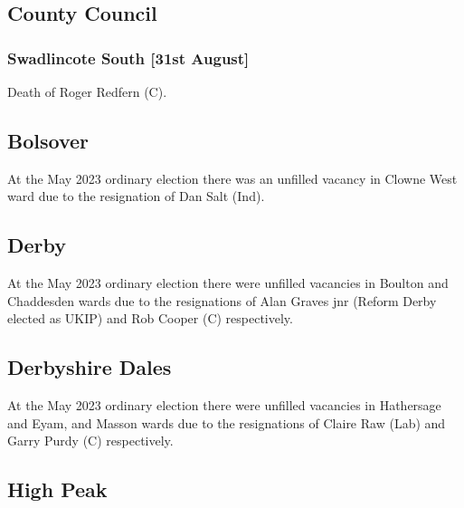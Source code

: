 \documentclass[a4paper,openany]{book}
\begin{document}
\begin{resultsiii}
\subsection*{County Council}

\subsubsection*{Swadlincote South \hspace*{\fill}\nolinebreak[1]%
	\enspace\hspace*{\fill}
	[31st August]}


Death of Roger Redfern (C).

\subsection*{Bolsover}

At the May 2023 ordinary election there was an unfilled vacancy in Clowne West ward due to the resignation of Dan Salt (Ind).%

\subsection*{Derby}

At the May 2023 ordinary election there were unfilled vacancies in Boulton and Chaddesden wards due to the resignations of Alan Graves jnr (Reform Derby elected as UKIP) and Rob Cooper (C) respectively.%
%

\subsection*{Derbyshire Dales}

At the May 2023 ordinary election there were unfilled vacancies in Hathersage and Eyam, and Masson wards due to the resignations of Claire Raw (Lab) and Garry Purdy (C) respectively.%
%

\subsection*{High Peak}


\end{resultsiii}
\end{document}
